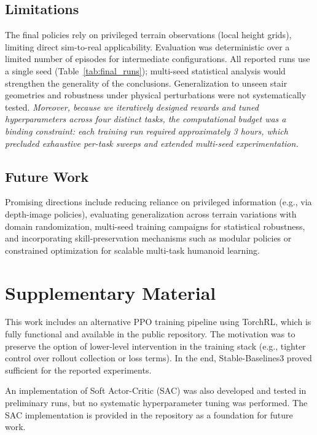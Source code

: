 \documentclass[conference]{IEEEtran}
\begin{document}
\subsection{Limitations}

The final policies rely on privileged terrain observations (local height grids), limiting direct sim-to-real applicability. Evaluation was deterministic over a limited number of episodes for intermediate configurations. All reported runs use a single seed (Table~\ref{tab:final_runs}); multi-seed statistical analysis would strengthen the generality of the conclusions. Generalization to unseen stair geometries and robustness under physical perturbations were not systematically tested. \emph{Moreover, because we iteratively designed rewards and tuned hyperparameters across four distinct tasks, the computational budget was a binding constraint: each training run required approximately 3 hours, which precluded exhaustive per-task sweeps and extended multi-seed experimentation.}


\subsection{Future Work}

Promising directions include reducing reliance on privileged information (e.g., via depth-image policies), evaluating generalization across terrain variations with domain randomization, multi-seed training campaigns for statistical robustness, and incorporating skill-preservation mechanisms such as modular policies or constrained optimization for scalable multi-task humanoid learning.





\appendices

\section{Supplementary Material}
\label{app:supp}

This work includes an alternative PPO training pipeline using TorchRL, which is fully functional and available in the public repository. The motivation was to preserve the option of lower-level intervention in the training stack (e.g., tighter control over rollout collection or loss terms). In the end, Stable-Baselines3 proved sufficient for the reported experiments.

An implementation of Soft Actor-Critic (SAC) was also developed and tested in preliminary runs, but no systematic hyperparameter tuning was performed. The SAC implementation is provided in the repository as a foundation for future work.
\end{document}
